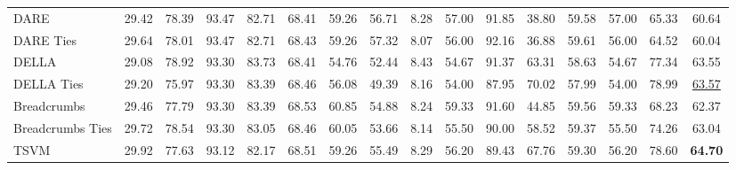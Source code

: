 \begin{table*}
{\begin{tabular}{lcccccccc|c|cc|cccc}
      DARE                                   & 29.42                                     & 78.39            & 93.47                                      & 82.71                                  & 68.41                                 & 59.26                                   & 56.71                         & 8.28     & 57.00           & 91.85           & 38.80       & 59.58 & 57.00 & 65.33 & 60.64             \\
      DARE Ties                              & 29.64                                     & 78.01            & 93.47                                      & 82.71                                  & 68.43                                 & 59.26                                   & 57.32                         & 8.07     & 56.00           & 92.16           & 36.88       & 59.61 & 56.00 & 64.52 & 60.04             \\
      DELLA                                  & 29.08                                     & 78.92            & 93.30                                      & 83.73                                  & 68.41                                 & 54.76                                   & 52.44                         & 8.43     & 54.67           & 91.37           & 63.31       & 58.63 & 54.67 & 77.34 & 63.55             \\
      DELLA  Ties                            & 29.20                                     & 75.97            & 93.30                                      & 83.39                                  & 68.46                                 & 56.08                                   & 49.39                         & 8.16     & 54.00           & 87.95           & 70.02       & 57.99 & 54.00 & 78.99 & \underline{63.57} \\
      Breadcrumbs                            & 29.46                                     & 77.79            & 93.30                                      & 83.39                                  & 68.53                                 & 60.85                                   & 54.88                         & 8.24     & 59.33           & 91.60           & 44.85       & 59.56 & 59.33 & 68.23 & 62.37             \\
      Breadcrumbs Ties                       & 29.72                                     & 78.54            & 93.30                                      & 83.05                                  & 68.46                                 & 60.05                                   & 53.66                         & 8.14     & 55.50           & 90.00           & 58.52       & 59.37 & 55.50 & 74.26 & 63.04             \\
      TSVM                                   & 29.92                                     & 77.63            & 93.12                                      & 82.17                                  & 68.51                                 & 59.26                                   & 55.49                         & 8.29     & 56.20           & 89.43           & 67.76       & 59.30 & 56.20 & 78.60 & \textbf{64.70}    \\
      \bottomrule
    \end{tabular}
  }
\end{table*}
